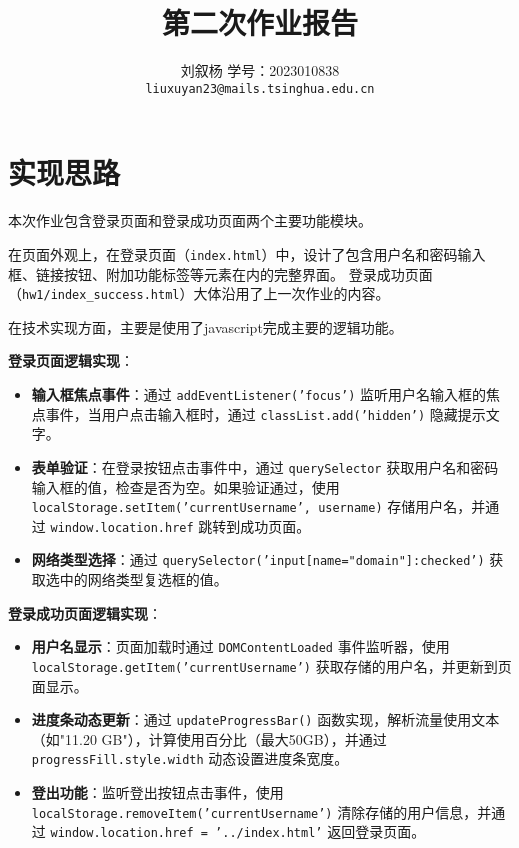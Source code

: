 \documentclass[UTF8]{ctexart}
\title{第二次作业报告}
\author{刘叙杨 \quad 学号：2023010838\\ \texttt{liuxuyan23@mails.tsinghua.edu.cn}}
\date{}
\begin{document}
\maketitle

\section{实现思路}

本次作业包含登录页面和登录成功页面两个主要功能模块。

在页面外观上，在登录页面（\texttt{index.html}）中，设计了包含用户名和密码输入框、链接按钮、附加功能标签等元素在内的完整界面。
登录成功页面（\texttt{hw1/index\_success.html}）大体沿用了上一次作业的内容。

在技术实现方面，主要是使用了javascript完成主要的逻辑功能。

\textbf{登录页面逻辑实现}：
\begin{itemize}
    \item \textbf{输入框焦点事件}：通过 \texttt{addEventListener('focus')} 监听用户名输入框的焦点事件，当用户点击输入框时，通过 \texttt{classList.add('hidden')} 隐藏提示文字。
    
    \item \textbf{表单验证}：在登录按钮点击事件中，通过 \texttt{querySelector} 获取用户名和密码输入框的值，检查是否为空。如果验证通过，使用 \texttt{localStorage.setItem('currentUsername', username)} 存储用户名，并通过 \texttt{window.location.href} 跳转到成功页面。
    
    \item \textbf{网络类型选择}：通过 \texttt{querySelector('input[name="domain"]:checked')} 获取选中的网络类型复选框的值。
\end{itemize}

\textbf{登录成功页面逻辑实现}：
\begin{itemize}
    \item \textbf{用户名显示}：页面加载时通过 \texttt{DOMContentLoaded} 事件监听器，使用 \texttt{localStorage.getItem('currentUsername')} 获取存储的用户名，并更新到页面显示。
    
    \item \textbf{进度条动态更新}：通过 \texttt{updateProgressBar()} 函数实现，解析流量使用文本（如"11.20 GB"），计算使用百分比（最大50GB），并通过 \texttt{progressFill.style.width} 动态设置进度条宽度。
    
    \item \textbf{登出功能}：监听登出按钮点击事件，使用 \texttt{localStorage.removeItem('currentUsername')} 清除存储的用户信息，并通过 \texttt{window.location.href = '../index.html'} 返回登录页面。
\end{itemize}
\end{document}

